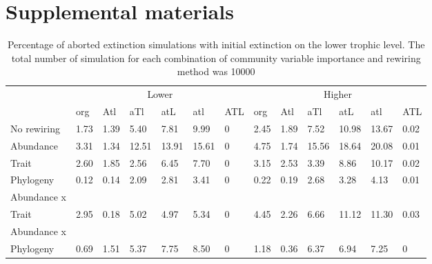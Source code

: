 \documentclass[12pt,a4paper]{article}
\begin{document}
\section{Supplemental materials}
\begin{landscape}
\begin{table}[H]
\centering
\captionsetup{width = .7\linewidth}
\caption{Percentage of aborted extinction simulations with initial extinction on the lower trophic level. The total number of simulation for each combination of community variable importance and rewiring method was 10000}
\label{tab:abort_perc}
\begin{tabularx}{.7\linewidth}{lllllllllllll}
\toprule
  & \multicolumn{6}{c}{Lower} & \multicolumn{6}{c}{Higher} \\ \cmidrule(l){2-7} \cmidrule(l){8-13}
 & org & Atl & aTl & atL & atl & ATL & org & Atl & aTl & atL & atl & ATL \\ \midrule
No rewiring & 1.73 & 1.39 & 5.40 & 7.81 & 9.99 & 0 & 2.45 & 1.89 & 7.52 & 10.98 & 13.67 & 0.02  \\
Abundance & 3.31 & 1.34 & 12.51 & 13.91 & 15.61 & 0 & 4.75 & 1.74 & 15.56 & 18.64 & 20.08 & 0.01 \\
Trait & 2.60 & 1.85 & 2.56 & 6.45 & 7.70 & 0 & 3.15 & 2.53 & 3.39 & 8.86 & 10.17 & 0.02 \\
Phylogeny & 0.12 & 0.14 & 2.09 & 2.81 & 3.41 & 0 & 0.22 & 0.19 & 2.68 & 3.28 & 4.13 & 0.01 \\
Abundance x \\ Trait & 2.95 & 0.18 & 5.02 & 4.97 & 5.34 & 0 & 4.45 & 2.26 & 6.66 & 11.12 & 11.30 & 0.03 \\
Abundance x \\ Phylogeny & 0.69 & 1.51 & 5.37 & 7.75 & 8.50 & 0 & 1.18 & 0.36 & 6.37 & 6.94 & 7.25 & 0 \\ \bottomrule
\end{tabularx}%
\end{table}
\end{landscape}
\end{document}
